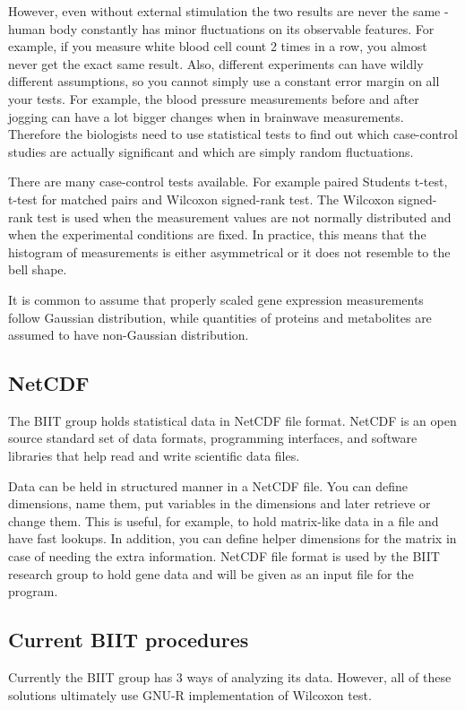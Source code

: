 \documentclass[12pt]{article}
\begin{document}
{However, even without external stimulation the two results are never the same - human body constantly has minor fluctuations on its observable features. For example, if you measure white blood cell count 2 times in a row, you almost never get the exact same result. Also, different experiments can have wildly different assumptions, so you cannot simply use a constant error margin on all your tests. For example, the blood pressure measurements before and after jogging can have a lot bigger changes when in brainwave measurements. Therefore the biologists need to use statistical tests to find out which case-control studies are actually significant and which are simply random fluctuations.

There are many case-control tests available. For example paired Students t-test, t-test for matched pairs and Wilcoxon signed-rank test. The Wilcoxon signed-rank test is used when the measurement values are not normally distributed and when the experimental conditions are fixed.  In practice, this means that the histogram of measurements is either asymmetrical or it does not resemble to the bell shape.

It is common to assume that properly scaled gene expression measurements follow Gaussian distribution, while quantities of proteins and metabolites are assumed to have non-Gaussian distribution.

\subsection{NetCDF}
The BIIT group holds statistical data in NetCDF file format. NetCDF is an open source standard set of data formats, programming interfaces, and software libraries that help read and write scientific data files. ~\cite{Netcdf}

Data can be held in structured manner in a NetCDF file. You can define dimensions, name them, put variables in the dimensions and later retrieve or change them. This is useful, for example, to hold matrix-like data in a file and have fast lookups. In addition, you can define helper dimensions for the matrix in case of needing the extra information. NetCDF file format is used by the BIIT research group to hold gene data and will be given as an input file for the program.

\subsection{Current BIIT procedures}
Currently the BIIT group has 3 ways of analyzing its data. However, all of these solutions ultimately use GNU-R implementation of Wilcoxon test.
}
\end{document}
